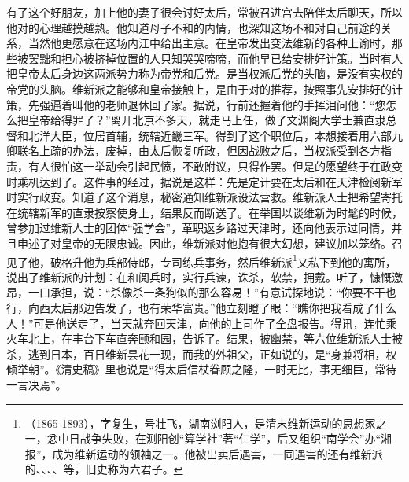   有了这个好朋友，加上他的妻子很会讨好太后，常被召进宫去陪伴太后聊天，所以他对的心理越摸越熟。他知道母子不和的内情，也深知这场不和对自己前途的关系，当然他更愿意在这场内江中给出主意。在皇帝发出变法维新的各种上谕时，那些被罢黜和担心被挤掉位置的人只知哭哭啼啼，而他早已给安排好计策。当时有人把皇帝太后身边这两派势力称为帝党和后党。是当权派后党的头脑，是没有实权的帝党的头脑。维新派之能够和皇帝接触上，是由于对的推荐，按照事先安排好的计策，先强逼着叫他的老师退休回了家。据说，行前还握着他的手挥泪问他：“您怎么把皇帝给得罪了？”离开北京不多天，就走马上任，做了文渊阁大学士兼直隶总督和北洋大臣，位居首辅，统辖近畿三军。得到了这个职位后，本想接着用六部九卿联名上疏的办法，废掉，由太后恢复听政，但因战败之后，当权派受到各方指责，有人很怕这一举动会引起民愤，不敢附议，只得作罢。但是的愿望终于在政变时乘机达到了。这件事的经过，据说是这样：先是定计要在太后和在天津检阅新军时实行政变。知道了这个消息，秘密通知维新派设法营救。维新派人士把希望寄托在统辖新军的直隶按察使身上，结果反而断送了。在举国以谈维新为时髦的时候，曾参加过维新人士的团体“强学会”，革职返乡路过天津时，还向他表示过同情，并且申述了对皇帝的无限忠诚。因此，维新派对他抱有很大幻想，建议加以笼络。召见了他，破格升他为兵部侍郎，专司练兵事务，然后维新派\footnote{（1865-1893），字复生，号壮飞，湖南浏阳人，是清末维新运动的思想家之一，忿中日战争失败，在测阳创“算学社”著“仁学”，后又组织“南学会”办“湘报”，成为维新运动的领袖之一。他被出卖后遇害，一同遇害的还有维新派的、、、、等，旧史称为六君子。}又私下到他的寓所，说出了维新派的计划：在和阅兵时，实行兵谏，诛杀，软禁，拥戴。听了，慷慨激昂，一口承担，说：“杀像杀一条狗似的那么容易！”有意试探地说：“你要不干也行，向西太后那边告发了，也有荣华富贵。”他立刻瞪了眼：“瞧你把我看成了什么人！”可是他送走了，当天就奔回天津，向他的上司作了全盘报告。得讯，连忙乘火车北上，在丰台下车直奔颐和园，告诉了。结果，被幽禁，等六位维新派人士被杀，逃到日本，百日维新昙花一现，而我的外祖父，正如说的，是“身兼将相，权倾举朝”。《清史稿》里也说是“得太后信杖眷顾之隆，一时无比，事无细巨，常待一言决焉”。\\

